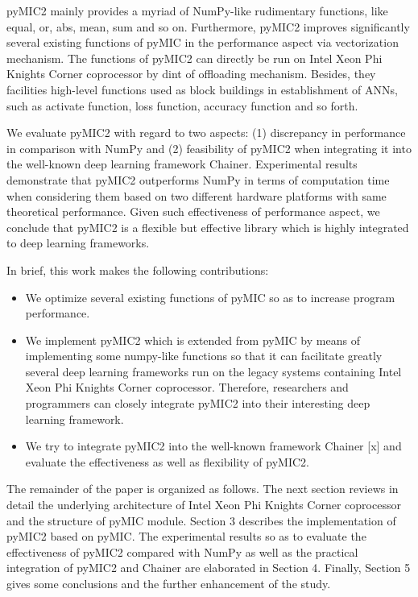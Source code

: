 pyMIC2 mainly provides a myriad of NumPy-like rudimentary functions, like equal, or, abs, mean, sum and so on. Furthermore, pyMIC2 improves significantly several existing functions of pyMIC in the performance aspect via vectorization mechanism. The functions of pyMIC2 can directly be run on Intel Xeon Phi Knights Corner coprocessor by dint of offloading mechanism. Besides, they facilities high-level functions used as block buildings in establishment of ANNs, such as activate function, loss function, accuracy function and so forth.

We evaluate pyMIC2 with regard to two aspects: (1) discrepancy in performance in comparison with NumPy and (2) feasibility of pyMIC2 when integrating it into the well-known deep learning framework Chainer. Experimental results demonstrate that pyMIC2 outperforms NumPy in terms of computation time when considering them based on two different hardware platforms with same theoretical performance. Given such effectiveness of performance aspect, we conclude that pyMIC2 is a flexible but effective library which is highly integrated to deep learning frameworks.

In brief, this work makes the following contributions:
\begin{itemize}
\item We optimize several existing functions of pyMIC so as to increase program performance.
\item We implement pyMIC2 which is extended from pyMIC by means of implementing some numpy-like functions so that it can facilitate greatly several deep learning frameworks run on the legacy systems containing Intel Xeon Phi Knights Corner coprocessor. Therefore, researchers and programmers can closely integrate pyMIC2 into their interesting deep learning framework.
\item We try to integrate pyMIC2 into the well-known framework Chainer [x] and evaluate the effectiveness as well as flexibility of pyMIC2.
\end{itemize}

The remainder of the paper is organized as follows. The next section reviews in detail the underlying architecture of Intel Xeon Phi Knights Corner coprocessor and the structure of pyMIC module. Section 3 describes the implementation of pyMIC2 based on pyMIC. The experimental results so as to evaluate the effectiveness of pyMIC2 compared with NumPy as well as the practical integration of pyMIC2 and Chainer are elaborated in Section 4. Finally, Section 5 gives some conclusions and the further enhancement of the study.